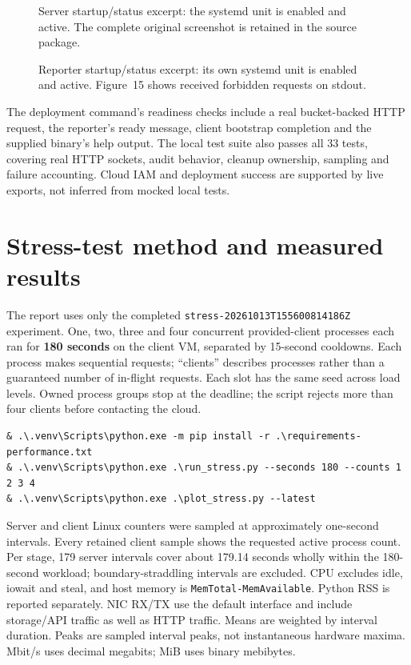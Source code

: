 \documentclass[11pt,letterpaper]{article}
\newcommand{\code}[1]{\texttt{\small #1}}
\newcommand{\newreportpage}[1]{\clearpage\section{#1}}
\begin{document}
\begin{figure}[H]\centering
{}
\caption{Server startup/status excerpt: the systemd unit is enabled and active. The complete original screenshot is retained in the source package.}\end{figure}
\begin{figure}[H]\centering
{}
\caption{Reporter startup/status excerpt: its own systemd unit is enabled and active. Figure~15 shows received forbidden requests on stdout.}\end{figure}
The deployment command's readiness checks include a real bucket-backed HTTP request,
the reporter's ready message, client bootstrap completion and the supplied binary's help
output. The local test suite also passes all 33 tests, covering real HTTP sockets,
audit behavior, cleanup ownership, sampling and failure accounting. Cloud IAM and
deployment success are supported by live exports, not inferred from mocked local tests.

\newreportpage{Stress-test method and measured results}
\label{sec:stress}
The report uses only the completed \nolinkurl{stress-20261013T155600814186Z} experiment.
One, two, three and four concurrent provided-client processes each ran for \textbf{180 seconds}
on the client VM, separated by 15-second cooldowns. Each process makes sequential requests;
``clients'' describes processes rather than a guaranteed number of in-flight requests.
Each slot has the same seed across load levels. Owned process groups stop at the deadline;
the script rejects more than four clients before contacting the cloud.

\begin{lstlisting}
& .\.venv\Scripts\python.exe -m pip install -r .\requirements-performance.txt
& .\.venv\Scripts\python.exe .\run_stress.py --seconds 180 --counts 1 2 3 4
& .\.venv\Scripts\python.exe .\plot_stress.py --latest
\end{lstlisting}
Server and client Linux counters were sampled at approximately one-second intervals.
Every retained client sample shows the requested active process count. Per stage, 179
server intervals cover about 179.14 seconds wholly within the 180-second workload;
boundary-straddling intervals are excluded. CPU excludes idle, iowait and steal, and
host memory is \code{MemTotal-MemAvailable}. Python RSS is reported separately. NIC RX/TX
use the default interface and include storage/API traffic as well as HTTP traffic.
Means are weighted by interval duration. Peaks are sampled interval peaks, not instantaneous
hardware maxima. Mbit/s uses decimal megabits; MiB uses binary mebibytes.
\end{document}
